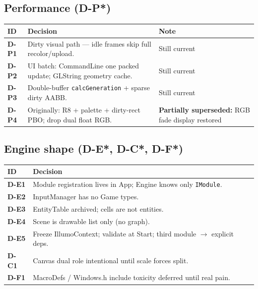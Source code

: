\documentclass[10pt,a4paper]{article}
\begin{document}
\subsection{Performance (D-P*)}
\begin{table}[h!]
\centering
\small
\begin{tabularx}{\textwidth}{l X l}
\toprule
\textbf{ID} & \textbf{Decision} & \textbf{Note} \\
\midrule
\textbf{D-P1} & Dirty visual path --- idle frames skip full recolor/upload. & Still current \\
\textbf{D-P2} & UI batch: CommandLine one packed update; GLString geometry cache. & Still current \\
\textbf{D-P3} & Double-buffer \texttt{calcGeneration} + sparse dirty AABB. & Still current \\
\textbf{D-P4} & Originally: R8 + palette + dirty-rect PBO; drop dual float RGB. & \textbf{Partially superseded:} RGB fade display restored \\
\bottomrule
\end{tabularx}
\end{table}

\subsection{Engine shape (D-E*, D-C*, D-F*)}
\begin{table}[h!]
\centering
\small
\begin{tabularx}{\textwidth}{l X}
\toprule
\textbf{ID} & \textbf{Decision} \\
\midrule
\textbf{D-E1} & Module registration lives in App; Engine knows only \texttt{IModule}. \\
\textbf{D-E2} & InputManager has no Game types. \\
\textbf{D-E3} & EntityTable archived; cells are not entities. \\
\textbf{D-E4} & Scene is drawable list only (no graph). \\
\textbf{D-E5} & Freeze IllumoContext; validate at Start; third module $\rightarrow$ explicit deps. \\
\textbf{D-C1} & Canvas dual role intentional until scale forces split. \\
\textbf{D-F1} & MacroDefs / Windows.h include toxicity deferred until real pain. \\
\bottomrule
\end{tabularx}
\end{table}
\end{document}
